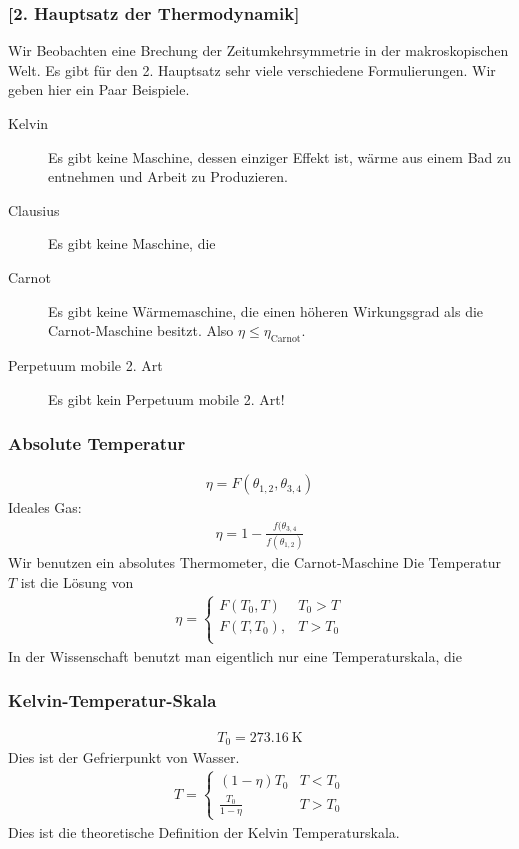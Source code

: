 \documentclass[11pt]{article}
\theoremstyle{plain}
\theoremstyle{mytheoremstyle}
\begin{document}
  \subsubsection*{[2. Hauptsatz der Thermodynamik]}
   
    Wir Beobachten eine Brechung der Zeitumkehrsymmetrie in der makroskopischen
    Welt.
    Es gibt für den 2. Hauptsatz sehr viele verschiedene Formulierungen.
    Wir geben hier ein Paar Beispiele.
    \begin{description}
      \item[Kelvin] Es gibt keine Maschine, dessen einziger Effekt ist, 
        wärme aus einem Bad zu entnehmen und Arbeit zu Produzieren.

      \item[Clausius] Es gibt keine Maschine, die 
      \item[Carnot] Es gibt keine Wärmemaschine, die einen höheren Wirkungsgrad
        als die Carnot-Maschine besitzt. Also $\eta \le \eta_{\text{Carnot}}$.

      \item[Perpetuum mobile 2. Art] Es gibt kein Perpetuum mobile 2. Art!
    \end{description}
\subsubsection*{Absolute Temperatur}
%
\begin{align*}
  \eta = F (\theta_{1,2}, \theta_{3,4})
\end{align*}
%
Ideales Gas:
%
\begin{align*}
  \eta = 1 -\frac{f(\theta_{3,4}}{f(\theta_{1,2})}
\end{align*}
%
Wir benutzen ein absolutes Thermometer, die Carnot-Maschine
%
Die Temperatur $T$ ist die Lösung von
\begin{align*}
  \eta = 
  \begin{cases}
    F(T_0, T)  & T_0 > T \\ 
    F(T, T_0), & T > T_0 \\
  \end{cases} 
\end{align*}
%
In der Wissenschaft benutzt man eigentlich nur eine Temperaturskala, die
\subsubsection*{Kelvin-Temperatur-Skala}
%
\begin{align*}
  T_0 = \SI{273,16}{\kelvin}
\end{align*}
%
Dies ist der Gefrierpunkt von Wasser.
%
\begin{align*}
  T = \begin{cases}
    (1- \eta) T_0 & T < T_0 \\
    \frac{T_0}{1- \eta} & T > T_0
  \end{cases} 
\end{align*}
%
Dies ist die theoretische Definition der Kelvin Temperaturskala.
\end{document}

